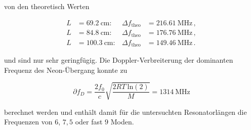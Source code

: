 von den theoretisch Werten

\vspace{-15pt}
\begin{align*}
    L &= \SI{ 69.2}{\centi\meter}: & \Delta f_\text{theo} &= \SI{216.61}{\mega\hertz}\, , \\  
    L &= \SI{ 84.8}{\centi\meter}: & \Delta f_\text{theo} &= \SI{176.76}{\mega\hertz}\, , \\  
    L &= \SI{100.3}{\centi\meter}: & \Delta f_\text{theo} &= \SI{149.46}{\mega\hertz}\, .  
\end{align*}

und sind nur sehr geringfügig.
Die Doppler-Verbreiterung der dominanten Frequenz des Neon-Übergang konnte zu

\begin{equation}
    \partial f_D = \frac{2f_0}{c} \sqrt{\frac{2RT\: \text{ln}(2)}{M}} = \SI{1314}{\mega\hertz}
\end{equation}

berechnet werden und enthält damit für die untersuchten Resonatorlängen 
die Frequenzen von $6$, $7,5$ oder fast $9$ Moden.
